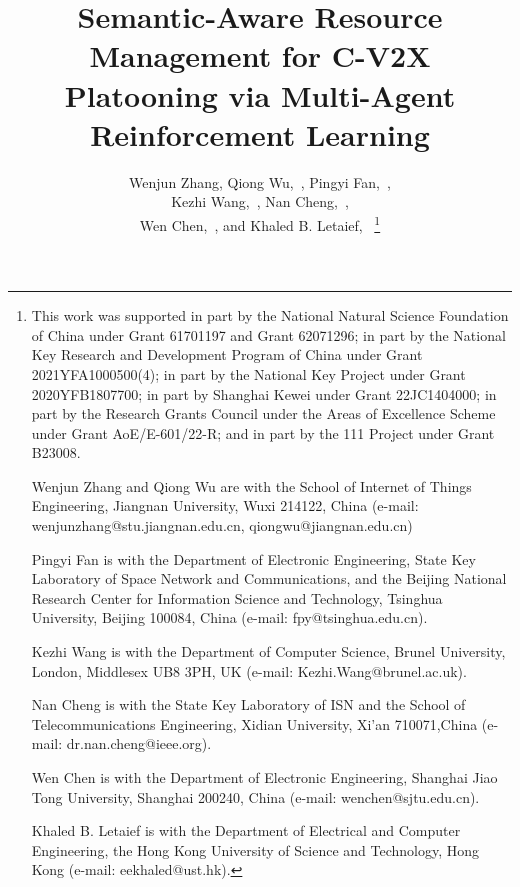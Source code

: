 \documentclass[10pt, lettersize,journal]{IEEEtran}
\begin{document}
	
	\title{Semantic-Aware Resource Management for C-V2X Platooning via Multi-Agent Reinforcement Learning}
	
	
	\author{Wenjun Zhang, Qiong Wu,~, Pingyi Fan,~,
		\\Kezhi Wang,~, Nan Cheng,~,
		\\Wen Chen,~, and Khaled B. Letaief,~
		\thanks{This work was supported in part by the National Natural Science Foundation of China under Grant 61701197 and Grant 62071296; in part by the National Key Research and Development Program of China under Grant 2021YFA1000500(4); in part by the National Key Project under Grant 2020YFB1807700; in part by Shanghai Kewei under Grant 22JC1404000; in part by the Research Grants Council under the Areas of Excellence Scheme under Grant AoE/E-601/22-R; and in part by the 111 Project under Grant B23008.
			
			Wenjun Zhang and Qiong Wu are with the School of Internet of Things Engineering, Jiangnan University, Wuxi 214122, China (e-mail: wenjunzhang@stu.jiangnan.edu.cn, qiongwu@jiangnan.edu.cn)
			
			Pingyi Fan is with the Department of Electronic Engineering, State Key Laboratory of Space Network and Communications, and the Beijing National Research Center for Information Science and Technology, Tsinghua University, Beijing 100084, China (e-mail: fpy@tsinghua.edu.cn).
			
			Kezhi Wang is with the Department of Computer Science, Brunel University, London, Middlesex UB8 3PH, UK (e-mail: Kezhi.Wang@brunel.ac.uk).
			
			Nan Cheng is with the State Key Laboratory of ISN and the School of Telecommunications Engineering, Xidian University, Xi'an 710071,China (e-mail: dr.nan.cheng@ieee.org).
			
			Wen Chen is with the Department of Electronic Engineering, Shanghai Jiao Tong University, Shanghai 200240, China (e-mail: wenchen@sjtu.edu.cn).
			
			
			Khaled B. Letaief is with the Department of Electrical and Computer Engineering, the Hong Kong University of Science and Technology, Hong Kong (e-mail: eekhaled@ust.hk).
			
			
			
		}%
	}
	
\end{document}

